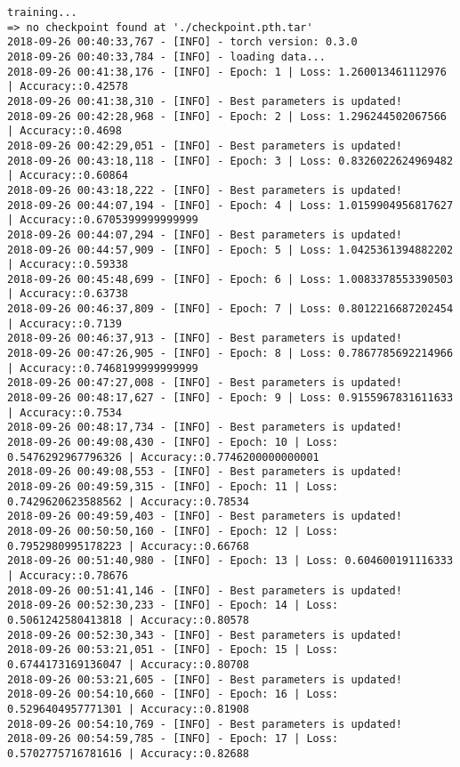 \documentclass[11pt]{article}
\begin{document}
    \begin{verbatim}
training...
=> no checkpoint found at './checkpoint.pth.tar'
2018-09-26 00:40:33,767 - [INFO] - torch version: 0.3.0
2018-09-26 00:40:33,784 - [INFO] - loading data...
2018-09-26 00:41:38,176 - [INFO] - Epoch: 1 | Loss: 1.260013461112976 | Accuracy::0.42578
2018-09-26 00:41:38,310 - [INFO] - Best parameters is updated!
2018-09-26 00:42:28,968 - [INFO] - Epoch: 2 | Loss: 1.296244502067566 | Accuracy::0.4698
2018-09-26 00:42:29,051 - [INFO] - Best parameters is updated!
2018-09-26 00:43:18,118 - [INFO] - Epoch: 3 | Loss: 0.8326022624969482 | Accuracy::0.60864
2018-09-26 00:43:18,222 - [INFO] - Best parameters is updated!
2018-09-26 00:44:07,194 - [INFO] - Epoch: 4 | Loss: 1.0159904956817627 | Accuracy::0.6705399999999999
2018-09-26 00:44:07,294 - [INFO] - Best parameters is updated!
2018-09-26 00:44:57,909 - [INFO] - Epoch: 5 | Loss: 1.0425361394882202 | Accuracy::0.59338
2018-09-26 00:45:48,699 - [INFO] - Epoch: 6 | Loss: 1.0083378553390503 | Accuracy::0.63738
2018-09-26 00:46:37,809 - [INFO] - Epoch: 7 | Loss: 0.8012216687202454 | Accuracy::0.7139
2018-09-26 00:46:37,913 - [INFO] - Best parameters is updated!
2018-09-26 00:47:26,905 - [INFO] - Epoch: 8 | Loss: 0.7867785692214966 | Accuracy::0.7468199999999999
2018-09-26 00:47:27,008 - [INFO] - Best parameters is updated!
2018-09-26 00:48:17,627 - [INFO] - Epoch: 9 | Loss: 0.9155967831611633 | Accuracy::0.7534
2018-09-26 00:48:17,734 - [INFO] - Best parameters is updated!
2018-09-26 00:49:08,430 - [INFO] - Epoch: 10 | Loss: 0.5476292967796326 | Accuracy::0.7746200000000001
2018-09-26 00:49:08,553 - [INFO] - Best parameters is updated!
2018-09-26 00:49:59,315 - [INFO] - Epoch: 11 | Loss: 0.7429620623588562 | Accuracy::0.78534
2018-09-26 00:49:59,403 - [INFO] - Best parameters is updated!
2018-09-26 00:50:50,160 - [INFO] - Epoch: 12 | Loss: 0.7952980995178223 | Accuracy::0.66768
2018-09-26 00:51:40,980 - [INFO] - Epoch: 13 | Loss: 0.604600191116333 | Accuracy::0.78676
2018-09-26 00:51:41,146 - [INFO] - Best parameters is updated!
2018-09-26 00:52:30,233 - [INFO] - Epoch: 14 | Loss: 0.5061242580413818 | Accuracy::0.80578
2018-09-26 00:52:30,343 - [INFO] - Best parameters is updated!
2018-09-26 00:53:21,051 - [INFO] - Epoch: 15 | Loss: 0.6744173169136047 | Accuracy::0.80708
2018-09-26 00:53:21,605 - [INFO] - Best parameters is updated!
2018-09-26 00:54:10,660 - [INFO] - Epoch: 16 | Loss: 0.5296404957771301 | Accuracy::0.81908
2018-09-26 00:54:10,769 - [INFO] - Best parameters is updated!
2018-09-26 00:54:59,785 - [INFO] - Epoch: 17 | Loss: 0.5702775716781616 | Accuracy::0.82688

\end{verbatim}
\end{document}

